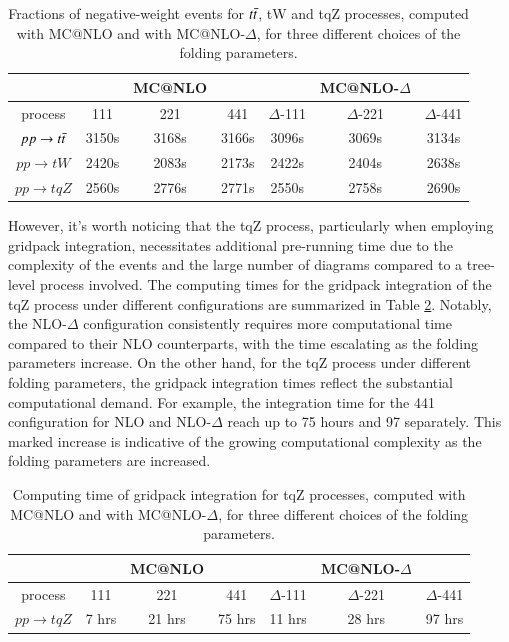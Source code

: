 \documentclass[NOTE, REPORT=true, atlasdraft=true, USenglish]{atlasdoc}
\begin{document}
\begin{table}[h!]
\centering
\begin{tabular}{||c| c c c | c c c||} 
 \hline
  & & MC@NLO & & & MC@NLO-$\Delta$ & \\ [0.5ex]
 \hline
  process & 111 & 221 & 441 & $\Delta$-111 & $\Delta$-221 & $\Delta$-441 \\ [0.5ex] 
  \hline
  $pp\rightarrow t\Bar{t}$ & 3150s & 3168s & 3166s & 3096s & 3069s & 3134s \\
  $pp\rightarrow tW$ & 2420s & 2083s & 2173s & 2422s & 2404s & 2638s \\ 
  $pp\rightarrow tqZ$ & 2560s & 2776s & 2771s & 2550s & 2758s & 2690s \\
 \hline
\end{tabular}
\caption{Fractions of negative-weight events for $t\Bar{t}$, tW and tqZ processes, computed with MC@NLO and with MC@NLO-$\Delta$, for three different choices of the folding parameters.}
\label{table:computational time}
\end{table}

However, it's worth noticing that the tqZ process, particularly when employing gridpack integration, necessitates additional pre-running time due to the complexity of the events and the large number of diagrams compared to a tree-level process involved. The computing times for the gridpack integration of the tqZ process under different configurations are summarized in Table \ref{table:gridpack time}. Notably, the NLO-$\Delta$ configuration consistently requires more computational time compared to their NLO counterparts, with the time escalating as the folding parameters increase. On the other hand, for the tqZ process under different folding parameters, the gridpack integration times reflect the substantial computational demand. For example, the integration time for the 441 configuration for NLO and NLO-$\Delta$ reach up to 75 hours and 97 separately. This marked increase is indicative of the growing computational complexity as the folding parameters are increased.

\begin{table}[h!]
\centering
\begin{tabular}{||c| c c c | c c c||} 
 \hline
  & & MC@NLO & & & MC@NLO-$\Delta$ & \\ [0.5ex]
 \hline
  process & 111 & 221 & 441 & $\Delta$-111 & $\Delta$-221 & $\Delta$-441 \\ [0.5ex] 
 \hline
  $pp\rightarrow tqZ$ & 7 hrs & 21 hrs & 75 hrs & 11 hrs & 28 hrs & 97 hrs \\
 \hline
\end{tabular}
\caption{Computing time of gridpack integration for tqZ processes, computed with MC@NLO and with MC@NLO-$\Delta$, for three different choices of the folding parameters.}
\label{table:gridpack time}
\end{table}
\end{document}
